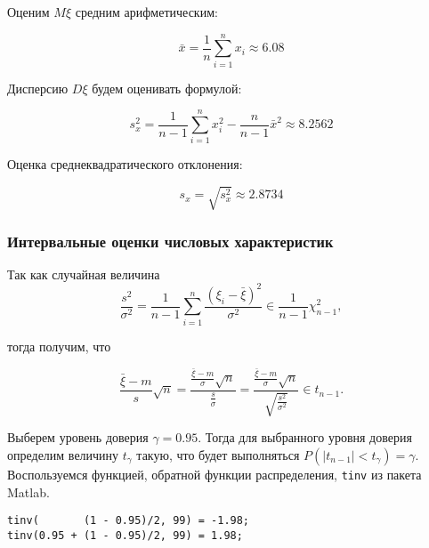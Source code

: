 \documentclass{report}
\begin{document}
Оценим $M\xi$ средним арифметическим: 

\begin{equation}
\bar x = \frac{1}{n}\sum \limits_{i=1}^{n}x_i \approx 6.08
\end{equation}

Дисперсию $D\xi$ будем оценивать формулой:

\begin{equation}
s_x^2 = \frac{1}{n - 1} \sum \limits_{i = 1}^{n} x_i^2 - \frac{n}{n - 1} \bar x^2 \approx 8.2562
\end{equation}

Оценка среднеквадратического отклонения: 

\begin{equation}
s_x = \sqrt{s_x^2} \approx 2.8734
\end{equation}

\newpage

\subsubsection*{Интервальные оценки числовых характеристик}

Так как случайная величина
\begin{equation} \label{eq:1}
\frac{s^2}{\sigma^2} = \frac{1}{n-1} \sum \limits_{i = 1}^{n} \frac{\left( \xi_i - \bar \xi \right)^2}{\sigma^2} \in \frac{1}{n - 1}\chi_{n-1}^2,
\end{equation}

тогда получим, что

\begin{equation} \label{eq:2}
\frac{\bar \xi - m}{s}\sqrt{n} = 
\frac{\frac{\bar \xi - m}{\sigma}\sqrt{n}}{\frac{s}{\sigma}} = 
\frac{\frac{\bar \xi - m}{\sigma}\sqrt{n}}{\sqrt{\frac{s^2}{\sigma^2}}} \in t_{n-1}.
\end{equation}

Выберем уровень доверия $\gamma = 0.95$. Тогда для выбранного уровня доверия определим величину $t_\gamma$ такую, что будет выполняться $P\left( |t_{n-1}| < t_\gamma \right) = \gamma$. Воспользуемся функцией, обратной функции распределения, \lstinline{tinv} из пакета Matlab.

\begin{lstlisting}
tinv(       (1 - 0.95)/2, 99) = -1.98;
tinv(0.95 + (1 - 0.95)/2, 99) = 1.98;
\end{lstlisting}

\end{document}
